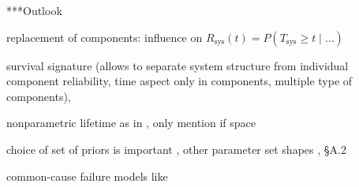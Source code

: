 \documentclass[12pt,a4paper,twocolumn,fleqn]{narms}
\newcommand{\comments}[1]{{\small\color{gray} #1}}
\begin{document}
***Outlook

replacement of components: influence on $R_\text{sys}(t) = P(T_\text{sys} \geq t \mid \ldots)$ 

survival signature \cite{2012:survsign} (allows to separate system structure from individual component reliability,
time aspect only in components, multiple type of components),

nonparametric lifetime as in , \comments{only mention if space}

choice of set of priors is important \cite{1991:pericchi},
other parameter set shapes \cite{Walter2011a}, \cite{diss} \S A.2

common-cause failure models like \cite{Troffaes2014a,2015:coolen-commoncause}



\end{document}
